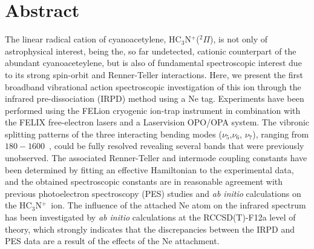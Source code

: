 \newcommand{\ion}{HC$_3$N$^+$}
\newcommand{\neion}{Ne$-$\ion}
\newcommand{\iont}{HC$_3$N$^+$ ion}
\newcommand{\wns}{cm$^{-1}$ }
\newcommand{\bmH}{\bm H}
\newcommand{\bmn}{\bm n}
\newcommand{\bra}[1]{\langle #1 |}
\newcommand{\ket}[1]{| #1 \rangle}
\newcommand{\braket}[2]{\langle #1 | #2 \rangle}


\section*{Abstract}
The linear radical cation of cyanoacetylene, \ion ($^2\Pi$), is not only of astrophysical interest, being the, so far undetected, cationic counterpart of the abundant cyanoaceteylene, but is also of fundamental spectroscopic interest due to its strong spin-orbit and Renner-Teller interactions. Here, we present the first broadband vibrational action spectroscopic investigation of this ion through the infrared pre-dissociation (IRPD) method using a Ne tag. Experiments have been performed using the FELion cryogenic ion-trap instrument in combination with the FELIX free-electron lasers and a Laservision OPO/OPA system. The vibronic splitting patterns of the three interacting bending modes ($\nu_5$,$\nu_6$, $\nu_7$), ranging from $180-1600$~\wn, could be fully resolved revealing several bands that were previously unobserved. The associated Renner-Teller and intermode coupling constants have been determined by fitting an effective Hamiltonian to the experimental data, and the obtained spectroscopic constants are in reasonable agreement with previous photoelectron spectroscopy (PES) studies and \emph{ab initio} calculations on the \ion\ ion. The influence of the attached Ne atom on the infrared spectrum has been investigated by \emph{ab initio} calculations at the RCCSD(T)-F12a level of theory, which strongly indicates that the discrepancies between the IRPD and PES data are a result of the effects of the Ne attachment.
\clearpage

